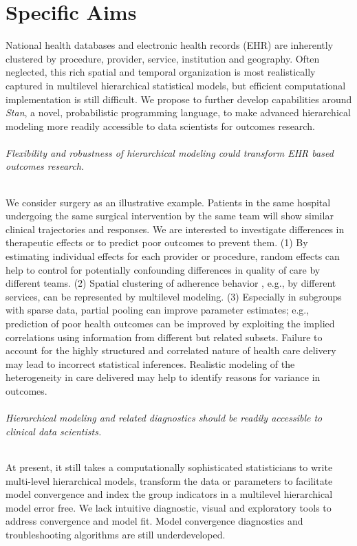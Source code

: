 \documentclass[11pt,notitlepage]{article}
\begin{document}
\part*{Specific Aims}
National health databases and electronic health records (EHR) are inherently 
clustered by procedure, provider, service, institution and geography. Often 
neglected, this rich spatial and temporal organization is most realistically 
captured in multilevel hierarchical statistical models, but efficient 
computational implementation is still difficult. We propose to further 
develop capabilities around \textit{Stan}, a novel, probabilistic programming language, 
to make advanced hierarchical modeling more readily accessible to data scientists 
for outcomes research. 

\paragraph*{Flexibility and robustness of hierarchical modeling could 
transform EHR based outcomes research.} We consider surgery as an 
illustrative example. Patients in the same hospital undergoing the 
same surgical intervention by the same team will show similar clinical 
trajectories and responses. We are interested to investigate 
differences in therapeutic effects or to predict poor outcomes to prevent 
them. (1) By estimating individual effects for each provider or procedure, 
random effects can help to control for potentially confounding differences 
in quality of care by different teams. (2) Spatial clustering of adherence 
behavior , e.g., by different services, can be represented by multilevel modeling. 
(3) Especially in subgroups with sparse data, partial pooling can improve 
parameter estimates; e.g., prediction of poor health outcomes can be 
improved by exploiting the implied correlations using information from 
different but related subsets. Failure to account for the highly 
structured and correlated nature of health care delivery may lead 
to incorrect statistical inferences. Realistic modeling of the heterogeneity in  care delivered may help to identify reasons for variance in outcomes.

\paragraph*{Hierarchical modeling and related diagnostics should be readily accessible 
to clinical data scientists.} At present, it still takes a computationally 
sophisticated statisticians to write multi-level hierarchical models, transform 
the data or parameters to facilitate model convergence and index the group 
indicators in a multilevel hierarchical model error free. We lack intuitive 
diagnostic, visual and exploratory tools to address convergence and model fit. 
Model convergence diagnostics and troubleshooting algorithms are still underdeveloped. 
\end{document}
